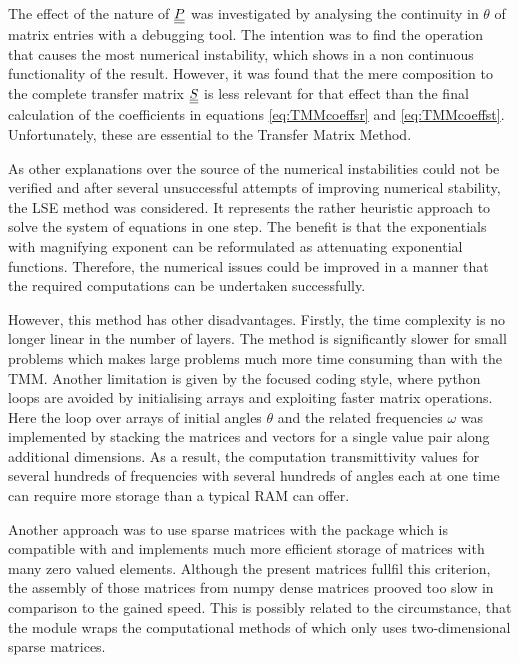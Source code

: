 The effect of the nature of $\underline{\underline{P}}$ was investigated by analysing
the continuity in $\theta$ of matrix entries with a debugging tool. The
intention was to find the operation that causes the most numerical instability,
which shows in a  non continuous functionality of the result.
However, it was found that the mere composition to the complete transfer
matrix $\underline{\underline{S}}$ is less relevant for that effect than the final calculation
of the coefficients in equations \ref{eq:TMMcoeffsr} and \ref{eq:TMMcoeffst}.
Unfortunately, these are essential to the Transfer Matrix Method.

As other explanations over the source of the numerical instabilities could not
be verified and after several unsuccessful attempts of improving numerical
stability, the LSE method was considered. It represents the rather heuristic
approach to solve the system of equations in one step. The benefit is that
the exponentials with magnifying exponent can be reformulated as attenuating
exponential functions. Therefore, the numerical issues could be improved in a
manner that the required computations can be undertaken successfully.

However, this method has other disadvantages. Firstly, the time complexity is
no longer linear in the number of layers. %
The method is significantly slower for small problems which makes large
problems much more time consuming than with the TMM.
Another limitation is given by
the  focused coding style, where python loops are avoided by
initialising arrays and exploiting faster matrix operations. Here the loop over
arrays of initial angles $\theta$ and the related frequencies $\omega$ was
implemented by stacking the matrices and vectors for a single value pair along
additional dimensions. As a result, the computation transmittivity values for
several hundreds of frequencies with several hundreds of angles each at one
time can require more storage than a typical RAM can offer.

Another approach was to use sparse matrices
with the package  which is compatible with  and
implements much more efficient storage of matrices with many zero valued
elements. Although the present matrices fullfil this criterion, the assembly of
those matrices from numpy dense matrices prooved too slow in comparison to the
gained speed. This is possibly related to the circumstance, that the module
wraps the computational methods of  which only uses
two-dimensional sparse matrices.

